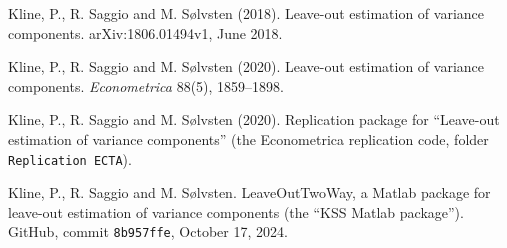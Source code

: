 \documentclass[11pt,letterpaper]{article}
\newcommand{\code}[1]{\texttt{#1}}
\begin{document}
\noindent Kline, P., R. Saggio and M. S{\o}lvsten (2018). Leave-out estimation of variance components. arXiv:1806.01494v1,
June 2018.

\noindent Kline, P., R. Saggio and M. S{\o}lvsten (2020). Leave-out estimation of variance components.
\emph{Econometrica} 88(5), 1859--1898.

\noindent Kline, P., R. Saggio and M. S{\o}lvsten (2020). Replication package for ``Leave-out estimation of variance
components'' (the Econometrica replication code, folder \code{Replication ECTA}).

\noindent Kline, P., R. Saggio and M. S{\o}lvsten. LeaveOutTwoWay, a Matlab package for leave-out estimation of
variance components (the ``KSS Matlab package''). GitHub, commit \code{8b957ffe}, October 17, 2024.

\clearpage
\appendix
\linespread{1.02}\selectfont

{\small}


{\small}
\end{document}
